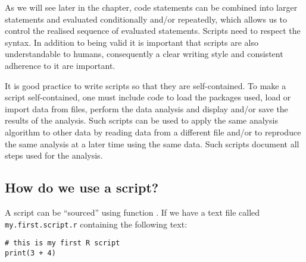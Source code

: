 \begin{playground}
\begin{center}
\begin{small}
\end{small}
\end{center}

As we will see later in the chapter, code statements can be combined into larger statements and evaluated conditionally and/or repeatedly, which allows us to control the realised sequence of evaluated statements. Scripts need to respect the \Rlang syntax. In addition to being valid it is important that scripts are also understandable to humans, consequently a clear writing style and consistent adherence to it are important.

It is good practice to write scripts so that they are self-contained. To make a script self-contained, one must include code to load the packages used, load or import data from files, perform the data analysis and display and/or save the results of the analysis. Such scripts can be used to apply the same analysis algorithm to other data by reading data from a different file and/or to reproduce the same analysis at a later time using the same data. Such scripts document all steps used for the analysis.



\subsection{How do we use a script?}\label{sec:script:using}

A script can be ``sourced'' using function . If we have a text file called \texttt{my.first.script.r} containing the following text:
\begin{shaded}
\footnotesize
\begin{verbatim}
# this is my first R script
print(3 + 4)
\end{verbatim}
\end{shaded}


\end{playground}
